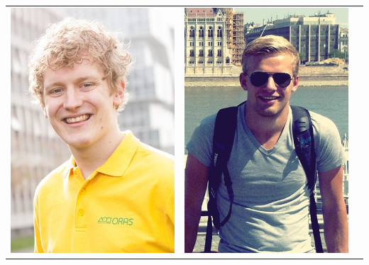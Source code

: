 \begin{titlepage}
\begin{center}
\begin{table}[ht]
\begin{tabular}{ccc}
\includegraphics[scale=0.2]{../photos/mathijs.png} &
\includegraphics[scale=0.2]{../photos/jasper.png}  \\

\end{tabular}
\end{table}
\end{center}
\end{titlepage}
